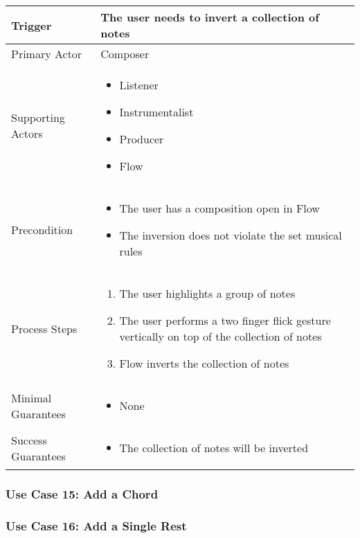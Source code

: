   \begin{tabularx}{\textwidth}{|X|X|}
  \hline
  Trigger & 
  The user needs to invert a collection of notes \\
  \hline
  Primary Actor & 
  Composer \\
  \hline
  Supporting Actors & 
  \begin{itemize}
  \item Listener
  \item Instrumentalist
  \item Producer
  \item Flow
  \end{itemize} \\
  \hline
  Precondition & 
  \begin{itemize}
  \item The user has a composition open in Flow
  \item The inversion does not violate the set musical rules
  \end{itemize} \\
  \hline
  Process Steps & 
  \begin{enumerate}
  \item The user highlights a group of notes
  \item The user performs a two finger flick gesture vertically on top of the collection of notes
  \item Flow inverts the collection of notes
  \end{enumerate} \\
  \hline
  Minimal Guarantees & 
  \begin{itemize}
    \item None
  \end{itemize} \\
  \hline
  Success Guarantees & 
  \begin{itemize}
    \item The collection of notes will be inverted
  \end{itemize} \\
  \hline
  \end{tabularx}

  \subsubsection{Use Case 15: Add a Chord}


  \subsubsection{Use Case 16: Add a Single Rest}

